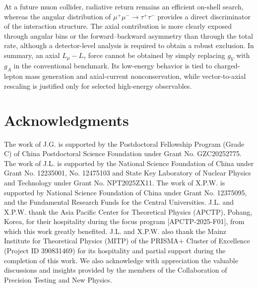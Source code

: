 \documentclass[onecolumn, aps, nofootinbib, prd, preprint, floats, floatfix, amsmath, amssymb, superscriptaddress, preprintnumbers]{revtex4-2}
\begin{document}
At a future muon collider, radiative return remains an efficient on-shell search, whereas the angular distribution of $\mu^+\mu^-\to\tau^+\tau^-$ provides a direct discriminator of the interaction structure. The axial contribution is more clearly exposed through angular bins or the forward--backward asymmetry than through the total rate, although a detector-level analysis is required to obtain a robust exclusion. In summary, an axial $L_\mu-L_\tau$ force cannot be obtained by simply replacing $g_V$ with $g_A$ in the conventional benchmark. Its low-energy behavior is tied to charged-lepton mass generation and axial-current nonconservation, while vector-to-axial rescaling is justified only for selected high-energy observables.



\section{Acknowledgments}
The work of J.G. is supported by the Postdoctoral Fellowship Program (Grade C) of China Postdoctoral Science Foundation under Grant No. GZC20252775.
The work of J.L. is supported by the National Science Foundation of China under Grant No. 12235001, No. 12475103
and State Key Laboratory of Nuclear Physics and Technology under Grant No. NPT2025ZX11. 
The work of X.P.W. is supported by National Science Foundation of China under Grant No. 12375095, and the Fundamental Research Funds for the Central Universities.
J.L. and X.P.W. thank the Asia Pacific Center for Theoretical Physics (APCTP), Pohang, Korea, for their hospitality during the focus program [APCTP-2025-F01], from which this work greatly benefited. J.L. and X.P.W. also thank the Mainz Institute for Theoretical Physics (MITP) of the PRISMA+ Cluster of Excellence (Project ID 390831469) for its hospitality and partial support during the completion of this work. We also acknowledge with appreciation the valuable discussions and insights provided by the members of the Collaboration of Precision Testing and New Physics.



\end{document}

